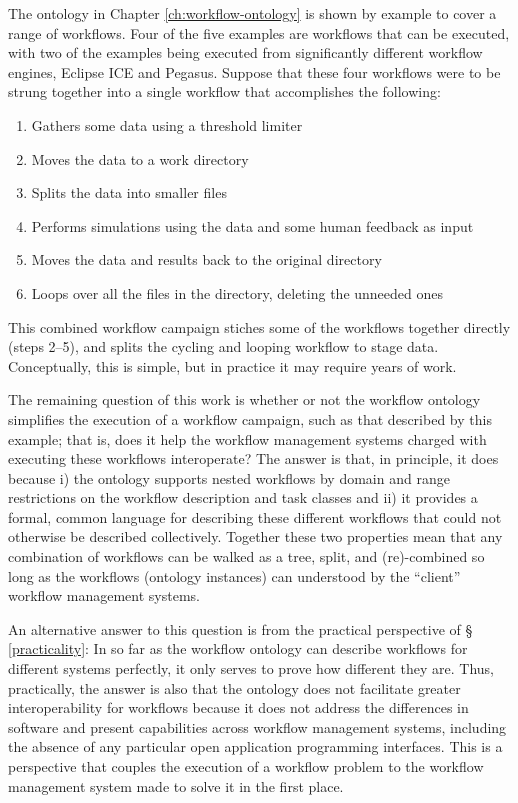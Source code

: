 The ontology in Chapter \ref{ch:workflow-ontology} is shown by example to cover
a range of workflows. Four of the five examples are workflows that can be
executed, with two of the examples being executed from significantly different
workflow engines, Eclipse ICE and Pegasus. Suppose that these four workflows
were to be strung together into a single workflow that accomplishes the
following:
\begin{enumerate}
  \item Gathers some data using a threshold limiter
  \item Moves the data to a work directory
  \item Splits the data into smaller files
  \item Performs simulations using the data and some human feedback as input
  \item Moves the data and results back to the original directory
  \item Loops over all the files in the directory, deleting the unneeded ones
\end{enumerate}
This combined workflow campaign stiches some of the workflows together directly
(steps 2--5), and splits the cycling and looping workflow to stage data.
Conceptually, this is simple, but in practice it may require years of work.

The remaining question of this work is whether or not the workflow ontology
simplifies the execution of a workflow campaign, such as that described by
this example; that is, does it help the workflow management systems charged with
executing these workflows interoperate? The answer is that, in principle, it
does because i) the ontology supports nested workflows by domain and range
restrictions on the workflow description and task classes and ii) it provides a
formal, common language for describing these different workflows that could not
otherwise be described collectively. Together these two properties mean that
any combination of workflows can be walked as a tree, split, and (re)-combined
so long as the workflows (ontology instances) can understood by the ``client''
workflow management systems.

An alternative answer to this question is from the practical perspective of \S
\ref{practicality}: In so far as the workflow ontology can describe workflows
for different systems perfectly, it only serves to prove how different they are.
Thus, practically, the answer is also that the ontology does not facilitate
greater interoperability for workflows because it does not address the
differences in software and present capabilities across workflow management
systems, including the absence of any particular open application programming
interfaces. This is a perspective that couples the execution of a workflow
problem to the workflow management system made to solve it in the first place.

